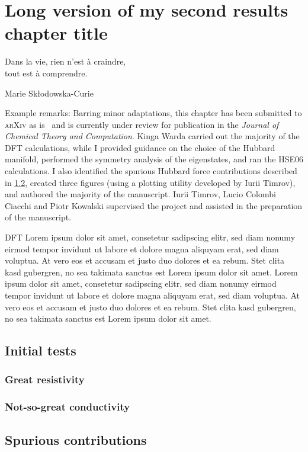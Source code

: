 \chapter[My second results chapter]{Long version of my second results chapter title}
    \label{cha:second-results}

\epigraph{%
    Dans la vie, rien n'est à craindre,\\ tout est à comprendre.\footnotemark}
    {Marie Skłodowska-Curie}


\begin{remarks}
    Example remarks: Barring minor adaptations, this chapter has been submitted to \textsc{arXiv} as is~ and is currently under review for publication in the \textit{Journal of Chemical Theory and Computation}.
    Kinga Warda carried out the majority of the \ac{DFT} calculations, while I provided guidance on the choice of the Hubbard manifold, performed the symmetry analysis of the eigenstates, and ran the HSE06 calculations. 
    I also identified the spurious Hubbard force contributions described in \cref{sec:second-spurious}, created three figures (using a plotting utility developed by Iurii Timrov), and authored the majority of the manuscript. 
    Iurii Timrov, Lucio Colombi Ciacchi and Piotr Kowalski supervised the project and assisted in the preparation of the manuscript.
\end{remarks}

%
\noindent \Ac{DFT} Lorem ipsum dolor sit amet, consetetur sadipscing elitr, sed diam nonumy eirmod tempor invidunt ut labore et dolore magna aliquyam erat, sed diam voluptua.
    At vero eos et accusam et justo duo dolores et ea rebum.
    Stet clita kasd gubergren, no sea takimata sanctus est Lorem ipsum dolor sit amet.
    Lorem ipsum dolor sit amet, consetetur sadipscing elitr, sed diam nonumy eirmod tempor invidunt ut labore et dolore magna aliquyam erat, sed diam voluptua.
    At vero eos et accusam et justo duo dolores et ea rebum.
    Stet clita kasd gubergren, no sea takimata sanctus est Lorem ipsum dolor sit amet. \medskip


\section{Initial tests}
    \label{sec:second-tests}
    \subsection{Great resistivity}
        \label{subsec:second-resistivity}
    \subsection{Not-so-great conductivity}
        \label{subsec:second-conductivity}

\section{Spurious contributions}
    \label{sec:second-spurious}